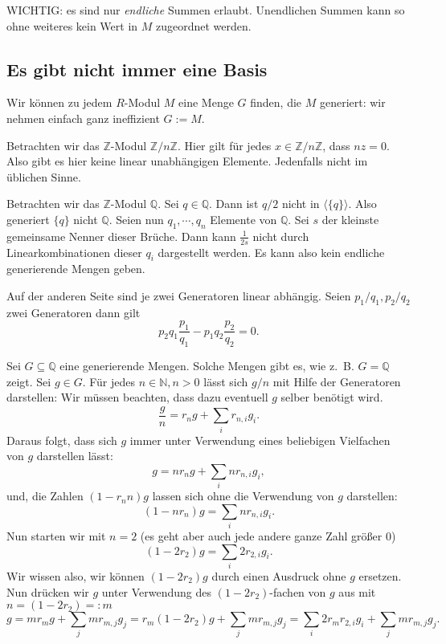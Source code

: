 \documentclass[a4paper]{amsart}
\theoremstyle{definition}
\newcommand{\Q}{\ensuremath{\mathbb{ Q }}}
\newcommand{\Z}{\ensuremath{\mathbb{ Z }}}
\newcommand{\N}{\ensuremath{\mathbb{ N }}}
\newcommand{\zz}[1]{\ensuremath{\Z /#1\Z}}
\newcommand{\zb}{z.~B. }
\begin{document}
WICHTIG: es sind nur \emph{endliche} Summen erlaubt. Unendlichen Summen kann so ohne weiteres kein Wert in $M$ zugeordnet werden.

\subsection{Es gibt nicht immer eine Basis}
Wir können zu jedem $R$-Modul $M$ eine Menge $G$ finden, die $M$ generiert: wir nehmen einfach ganz ineffizient $G := M$.

Betrachten wir das $\Z$-Modul $\zz{n}$. Hier gilt für jedes $x \in \zz{n}$, dass $nz = 0$. Also gibt es hier keine linear unabhängigen Elemente. Jedenfalls nicht im üblichen Sinne.

Betrachten wir das $\Z$-Modul $\Q$. Sei $q \in \Q$. Dann ist $q/2$ nicht in $\langle \{q\}\rangle$. Also generiert $\{q\}$ nicht $\Q$. Seien nun $q_1, \cdots, q_n$ Elemente von $\Q$. Sei $s$ der kleinste gemeinsame Nenner dieser Brüche. Dann kann $\frac{1}{2s}$ nicht durch Linearkombinationen dieser $q_i$ dargestellt werden. Es kann also kein endliche generierende Mengen geben.

Auf der anderen Seite sind je zwei Generatoren linear abhängig. Seien $p_1/q_1, p_2/q_2$ zwei Generatoren dann gilt
\begin{equation}\label{linearAbhaengig}
   p_2q_1\frac{p_1}{q_1} - p_1q_2\frac{p_2}{q_2} = 0.
\end{equation}


Sei $G \subseteq \Q$ eine generierende Mengen. Solche Mengen gibt es, wie \zb $G =\Q$ zeigt. Sei $g \in G$. Für jedes $n \in \N, n>0$ lässt sich $g/n$ mit Hilfe der Generatoren darstellen: Wir müssen beachten, dass dazu eventuell $g$ selber benötigt wird.
\begin{equation}\label{gDurchN}
   \frac{g}{n} = r_ng + \sum_i r_{n,i}g_i. 
\end{equation}
Daraus folgt, dass sich $g$ immer unter Verwendung eines beliebigen Vielfachen von $g$ darstellen lässt:
\begin{equation}\label{gMalN}
   g = nr_ng + \sum_i nr_{n,i}g_i,
\end{equation}
und, die Zahlen $(1-r_nn)g$ lassen sich ohne die Verwendung von $g$ darstellen:
\begin{equation}\label{gMinusRN}
   (1-nr_n)g =  \sum_i nr_{n,i}g_i.
\end{equation}
Nun starten wir mit $n = 2$ (es geht aber auch jede andere ganze Zahl größer $0$)
\begin{equation}\label{g2}
   (1-2r_2)g =  \sum_i 2r_{2,i}g_i.
\end{equation}
Wir wissen also, wir können $(1-2r_2)g$ durch einen Ausdruck ohne $g$ ersetzen. Nun drücken wir $g$ unter Verwendung des $(1-2r_2)$-fachen von $g$ aus mit $n = (1-2r_2) =: m$ 
\begin{equation}\label{g}
   g = mr_mg + \sum_j mr_{m,j}g_j = r_m(1-2r_2)g + \sum_j mr_{m,j}g_j = \sum_i 2r_mr_{2,i}g_i + \sum_j mr_{m,j}g_j.
\end{equation}
\end{document}
